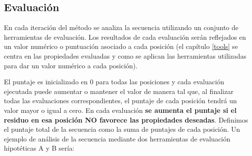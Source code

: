 




\subsection{Evaluación}\label{evaluacion}



En cada iteración del método se analiza la secuencia utilizando un conjunto de herramientas de evaluación.
Los resultados de cada evaluación serán reflejados en un valor numérico o puntuación asociado a cada posición
(el capítulo \ref{tools} se centra en las propiedades evaluadas y como se aplican las herramientas utilizadas para dar un valor numérico a cada posición). 

El puntaje es inicializado en 0 para todas las posiciones y cada evaluación ejecutada puede aumentar o mantener el valor de manera tal que, 
al finalizar todas las evaluaciones correspondientes, el puntaje de cada posición tendrá un valor mayor o igual a cero.
En cada evaluación \textbf{se aumenta el puntaje si el residuo en esa posición NO favorece las propiedades deseadas}.
Definimos el puntaje total de la secuencia como la suma de puntajes de cada posición.
Un ejemplo de análisis de la secuencia mediante dos herramientas de evaluación hipotéticas A y B sería: %


